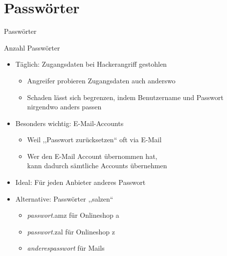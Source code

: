 \section{Passwörter}
\begin{frame}{Passwörter}


\end{frame}

\begin{frame}{Anzahl Passwörter}
  \begin{itemize}
    \item Täglich: Zugangsdaten bei Hackerangriff gestohlen
    \begin{itemize}
      \item Angreifer probieren Zugangsdaten auch anderswo
      \item Schaden lässt sich begrenzen, indem Benutzername und Passwort nirgendwo anders passen
    \end{itemize}
    \item Besonders wichtig: E-Mail-Accounts
    \begin{itemize}
      \item Weil ,,Passwort zurücksetzen`` oft via E-Mail
      \item Wer den E-Mail Account übernommen hat,\\ kann dadurch sämtliche Accounts übernehmen
    \end{itemize}
    \item Ideal: Für jeden Anbieter anderes Passwort
    \item Alternative: Passwörter ,,salzen``
    \begin{itemize}
      \item \textit{passwort}.amz für Onlineshop a
      \item \textit{passwort}.zal für Onlineshop z
      \item \textit{anderespasswort} für Mails
    \end{itemize}
  \end{itemize}
\end{frame}

